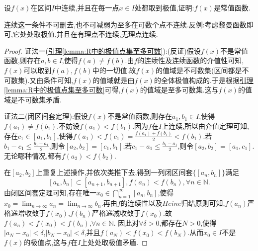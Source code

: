 \documentclass[../../main.tex]{subfiles}%
\begin{document}
\begin{example}
设\(f(x)\)在区间\(I\)中连续,并且在每一点\(x\in I\)处都取到极值,证明:\(f(x)\)是常值函数.
\end{example}
\begin{remark}
连续这一条件不可删去,也不可减弱为至多在可数个点不连续.反例:考虑黎曼函数即可,它处处取极值,并且在有理点不连续,无理点连续.
\end{remark}
\begin{proof}

{\color{blue}证法一(\hyperref[lemma:R中的极值点集至多可数]{引理\ref{lemma:R中的极值点集至多可数}}):}(反证)假设$f(x)$不是常值函数,则存在$a,b \in I$,使得$f(a)\ne f(b)$.由$f$的连续性及连续函数的介值性可知,$f(x)$可以取到$f(a),f(b)$中的一切值.故$f(x)$的值域是不可数集(区间都是不可数集).又由条件可知,$f(x)$的值域就是由$f(x)$的全体极值构成的.于是根据\hyperref[lemma:R中的极值点集至多可数]{引理\ref{lemma:R中的极值点集至多可数}}可得,$f(x)$的值域是至多可数集.这与$f(x)$的值域是不可数集矛盾.

{\color{blue}证法二(闭区间套定理):}假设$f(x)$不是常值函数,则存在$a_1,b_1 \in I$,使得$f(a_1)\ne f(b_1)$.不妨设$f(a_1)<f(b_1)$.因为\(f\)在\(I\)上连续,所以由介值定理可知,存在\(c_1\in [a_1,b_1]\),使得\(f(a_1) < f(c_1)=\frac{f(a_1) + f(b_1)}{2}<f(b_1)\).若\(b_1 - c_1\leqslant\frac{b_1 - a_1}{2}\),则令\([a_2,b_2]=[c_1,b_1]\);若\(c_1 - a_1\leqslant\frac{b_1 - a_1}{2}\),则令\([a_2,b_2]=[a_1,c_1]\).无论哪种情况,都有\(f(a_2) < f(b_2)\).

在\([a_2,b_2]\)上重复上述操作,并依次类推下去,得到一列闭区间套\(\{[a_n,b_n]\}\)满足
\[
[a_n,b_n]\subset [a_{n + 1},b_{n + 1}], f(a_n) < f(b_n),\forall n\in\mathbb{N}.
\]
由闭区间套定理可知,存在唯一\(x_0\in\bigcap_{n = 1}^{\infty}[a_n,b_n]\),使得\(x_0=\lim_{n\rightarrow\infty}a_n=\lim_{n\rightarrow\infty}b_n\).再由\(f\)的连续性以及\(Heine\)归结原则可知,\(f(a_n)\)严格递增收敛于\(f(x_0)\),\(f(b_n)\)严格递减收敛于\(f(x_0)\).故\(f(a_n) < f(x_0) < f(b_n)\),\(\forall n\in\mathbb{N}\).
因此对\(\forall\delta > 0\),都存在\(N > 0\),使得\(\vert a_N - x_0\vert<\delta\),\(\vert b_N - x_0\vert<\delta\),并且\(f(a_N) < f(x_0) < f(b_N)\).从而\(x_0\in I\)不是\(f(x)\)的极值点,这与\(f\)在\(I\)上处处取极值矛盾.

\end{proof}
\end{document}
